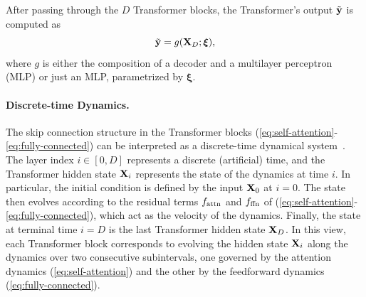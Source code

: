 \documentclass[journal]{IEEEtran}
\newcommand{\bfX}{{\bf X}}
\newcommand{\bfy}{ {\bf y}}
\newcommand{\bfxi}{{\boldsymbol \xi}}
\theoremstyle{plain}
\theoremstyle{definition}
\theoremstyle{remark}
\begin{document}
After passing through the $D$ Transformer blocks, the Transformer's output $\tilde{\bfy}$ is computed as
\begin{equation}\label{eq:output_layer}
    \tilde{\bfy} = g(\bfX_{D}; \bfxi),
\end{equation}
where $g$ is either the composition of a decoder and a multilayer perceptron (MLP) or just an MLP, parametrized by $\bfxi$.

\paragraph{Discrete-time Dynamics.} \label{par:dynamics}
The skip connection structure in the Transformer blocks (\ref{eq:self-attention}-\ref{eq:fully-connected}) can be interpreted as a discrete-time dynamical system~\cite{haber2017stable,ruthotto2020deep,lu2020understanding}. The layer index $i\in [0,D]$ represents a discrete (artificial) time, and the Transformer hidden state $\bfX_i$ represents the state of the dynamics at time $i$. In particular, the initial condition is defined by the input $\bfX_0$ at $i=0$. The state then evolves according to the residual terms $f_{\rm attn}$ and $f_{\rm ffn}$ of (\ref{eq:self-attention}-\ref{eq:fully-connected}), which act as the velocity of the dynamics. Finally, the state at terminal time $i=D$ is the last Transformer hidden state $\bfX_D$. In this view, each Transformer block corresponds to evolving the hidden state $\bfX_i$ along the dynamics over two consecutive subintervals, one governed by the attention dynamics (\ref{eq:self-attention}) and the other by the feedforward dynamics (\ref{eq:fully-connected}).
\end{document}
